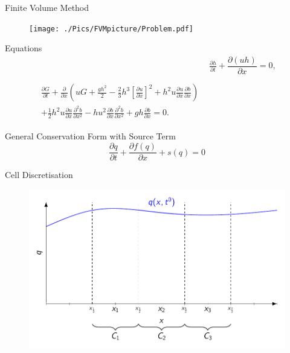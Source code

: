 \documentclass[pdf]{beamer}
\begin{document}
\begin{frame}{Finite Volume Method}
	\begin{figure}
		\texttt{[image: ./Pics/FVMpicture/Problem.pdf]}
	\end{figure}
\end{frame}
\begin{frame}{Equations}
	\begin{align*}
	& \frac{\partial h}{\partial t} + \dfrac{\partial (uh)}{\partial x} = 0 ,  \\ \nonumber \\
	\begin{split}
	\frac{\partial G}{\partial t}  + \frac{\partial}{\partial x} \left( {u} G + \frac{gh^2}{2} - \frac{2}{3}h^3 \left[\frac{\partial {u}}{\partial x}\right]^2 + h^2 {u}\frac{\partial {u}}{\partial x}\frac{\partial b}{\partial x} \right) \\ + \frac{1}{2}h^2 {u} \frac{\partial {u}}{\partial x} \frac{\partial^2 b}{\partial x^2}  - h {u}^2\frac{\partial b}{\partial x}\frac{\partial^2 b}{\partial x^2} + gh\frac{\partial b}{\partial x} = 0.
	\end{split}
	\end{align*}
	
	General Conservation Form with Source Term
	\begin{equation*}
	\frac{\partial q}{\partial t} + \frac{\partial f(q)}{\partial x} + s(q) = 0
	\end{equation*}
\end{frame}
\begin{frame}{Cell Discretisation}
	\begin{figure}
		\includegraphics[width=\textwidth]{./Pics/FVMpicture/Cells.pdf}
	\end{figure}
\end{frame}
\end{document}
